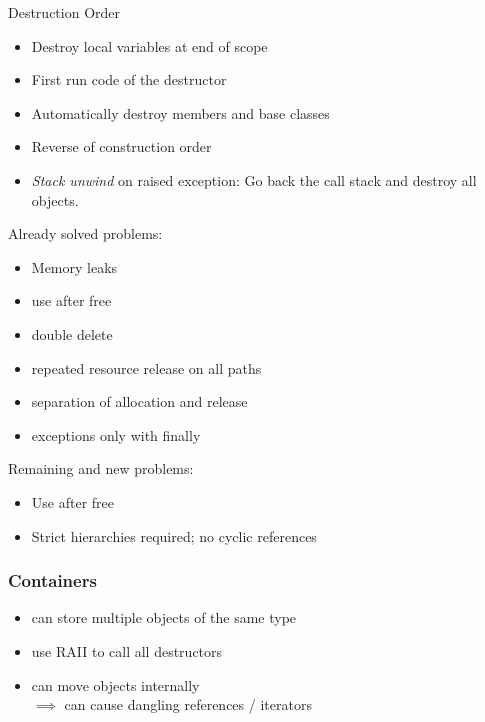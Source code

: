 \documentclass[xcolor=colortbl
]{beamer}
\begin{document}
\begin{frame}{Destruction Order}
    \begin{itemize}
        \item Destroy local variables at end of scope
        \item First run code of the destructor
        \item Automatically destroy members and base classes
        \item Reverse of construction order
        \item
        \emph{Stack unwind} on raised exception: Go back the call stack and destroy all objects.
    \end{itemize}
    
\end{frame}


\begin{frame}
    Already solved problems:
    \begin{itemize}
        \item Memory leaks
        \item use after free
        \item double delete
        \item repeated resource release on all paths
        \item separation of allocation and release
        \item exceptions only with finally
    \end{itemize}
    
    Remaining and new problems:
    \begin{itemize}
        \item Use after free
        \item Strict hierarchies required; no cyclic references
    \end{itemize}
\end{frame}



\begin{frame}
    \frametitle{Containers}
    \begin{itemize}
        \item can store multiple objects of the same type
        \item use RAII to call all destructors
        \item can move objects internally
        \\ $\implies$ can cause dangling references / iterators
    \end{itemize} 
\end{frame}
\end{document}
